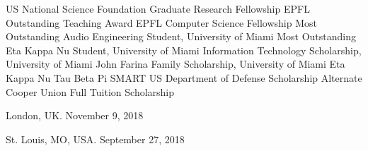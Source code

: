 \documentclass[9pt]{article}
\begin{document}
\bigskip

\medskip
{}

\noindent US National Science Foundation Graduate Research Fellowship 
\newline\noindent EPFL Outstanding Teaching Award 
\newline\noindent EPFL Computer Science Fellowship 
\newline\noindent Most Outstanding Audio Engineering Student, University of Miami 
\newline\noindent Most Outstanding Eta Kappa Nu Student, University of Miami 
\newline\noindent Information Technology Scholarship, University of Miami 
\newline\noindent John Farina Family Scholarship, University of Miami 
\newline\noindent Eta Kappa Nu 
\newline\noindent Tau Beta Pi 
\newline\noindent SMART US Department of Defense Scholarship Alternate 
\newline\noindent Cooper Union Full Tuition Scholarship 

\bigskip


\medskip
{}

\vspace{-0.02in}
 \vspace{-0.03in}
\linebreak\noindent London, UK. November 9, 2018 
\bigskip

 \vspace{-0.03in}
\newline{} 
\bigskip

 \vspace{-0.03in}
\linebreak\noindent St. Louis, MO, USA. September 27, 2018
\bigskip
\end{document}
